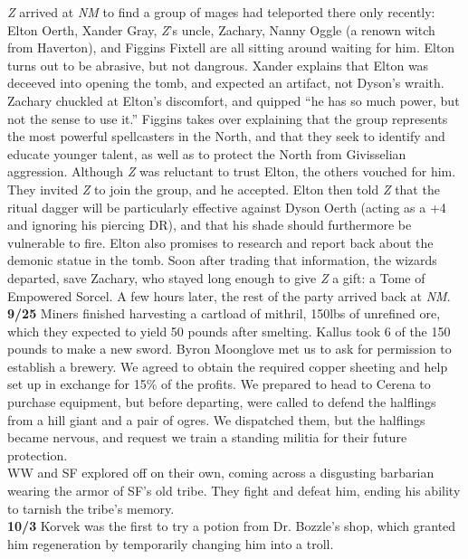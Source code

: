 \documentclass[letterpaper]{article}
\begin{document}
\noindent \emph{Z} arrived at \emph{NM} to find a group of mages had teleported there only recently: Elton Oerth, Xander Gray, \emph{Z}'s uncle, Zachary, Nanny Oggle (a renown witch from Haverton), and Figgins Fixtell are all sitting around waiting for him. Elton turns out to be abrasive, but not dangrous. Xander explains that Elton was deceeved into opening the tomb, and expected an artifact, not Dyson's wraith.  Zachary chuckled at Elton's discomfort, and quipped ``he has so much power, but not the sense to use it.'' Figgins takes over explaining that the group represents the most powerful spellcasters in the North, and that they seek to identify and educate younger talent, as well as to protect the North from Givisselian aggression.  Although \emph{Z} was reluctant to trust Elton, the others vouched for him.  They invited \emph{Z} to join the group, and he accepted.  Elton then told \emph{Z} that the ritual dagger will be particularly effective against Dyson Oerth (acting as a +4 and ignoring his piercing DR), and that his shade should furthermore be vulnerable to fire.  Elton also promises to research and report back about the demonic statue in the tomb.  Soon after trading that information, the wizards departed, save Zachary, who stayed long enough to give \emph{Z} a gift: a Tome of Empowered Sorcel.  A few hours later, the rest of the party arrived back at \emph{NM}. \\

\noindent \textbf{9/25} Miners finished harvesting a cartload of mithril, 150lbs of unrefined ore, which they expected to yield 50 pounds after smelting. Kallus took 6 of the 150 pounds to make a new sword.  Byron Moonglove met us to ask for permission to establish a brewery.  We agreed to obtain the required copper sheeting and help set up in exchange for 15\% of the profits. We prepared to head to Cerena to purchase equipment, but before departing, were called to defend the halflings from a hill giant and a pair of ogres.  We dispatched them, but the halflings became nervous, and request we train a standing militia for their future protection. \\

\noindent WW and SF explored off on their own, coming across a disgusting barbarian wearing the armor of SF's old tribe.  They fight and defeat him, ending his ability to tarnish the tribe's memory. \\

\noindent \textbf{10/3} Korvek was the first to try a potion from Dr. Bozzle's shop, which granted him regeneration by temporarily changing him into a troll. \\
\end{document}
